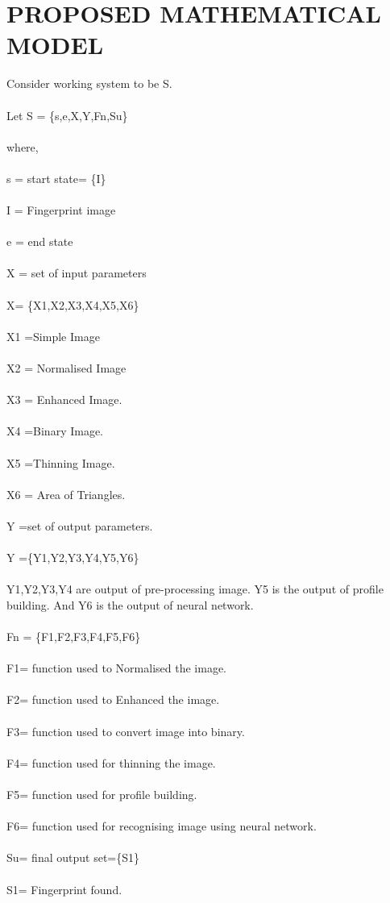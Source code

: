 \documentclass[a4paper, 12pt]{article}
\begin{document}
\section{PROPOSED MATHEMATICAL MODEL}
Consider working system to be S.\\\\
Let S = \{s,e,X,Y,Fn,Su\}\\\\
where,\\\\
s = start state= \{I\}\\\\
I = Fingerprint image\\\\
e = end state\\\\
X = set of input parameters\\\\
X= \{X1,X2,X3,X4,X5,X6\}\\\\
X1 =Simple Image\\\\
X2 = Normalised Image\\\\
X3 = Enhanced Image.\\\\
X4 =Binary Image.\\\\
X5 =Thinning Image.\\\\
X6 = Area of Triangles.\\\\
Y =set of output parameters.\\\\
Y =\{Y1,Y2,Y3,Y4,Y5,Y6\}\\\\
Y1,Y2,Y3,Y4 are output of pre-processing image. Y5 is the output of 
profile building. And Y6 is the output of neural network.\\\\
Fn = \{F1,F2,F3,F4,F5,F6\}\\\\
F1= function used to Normalised the image.\\\\
F2= function used to Enhanced the image.\\\\
F3= function used to convert image into binary.\\\\
F4= function used for thinning the image.\\\\
F5= function used for profile building.\\\\
F6= function used for recognising image using neural network.\\\\
Su= final output set=\{S1\}\\\\
S1= Fingerprint found.
\end{document}
